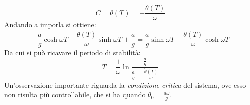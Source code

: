 \documentclass[12pt, a4paper]{book}
\theoremstyle{theorem}
\begin{document}
				\begin{equation}
					C=\theta(T)=-\frac{\dot{\theta}(T)}{\omega}
				\end{equation}
				Andando a imporla si ottiene:
				\begin{equation*}
					-\frac{a}{g}\cosh\omega T + \frac{\dot{\theta}(T)}{\omega}\sinh\omega T + \frac{a}{g} = \frac{a}{g}\sinh\omega T - \frac{\dot{\theta}(T)}{\omega}\cosh\omega T
				\end{equation*}
				Da cui si può ricavare il periodo di stabilità:
				\begin{equation}
					T=\frac{1}{\omega}\ln\frac{\frac{a}{g}}{\frac{a}{g}-\frac{\dot{\theta}(T)}{\omega}}
				\end{equation}
				Un'osservazione importante riguarda la \emph{condizione critica} del sistema, ove esso non risulta più controllabile, che si ha quando $\dot{\theta}_0=\frac{a\omega}{g}$.
\end{document}
